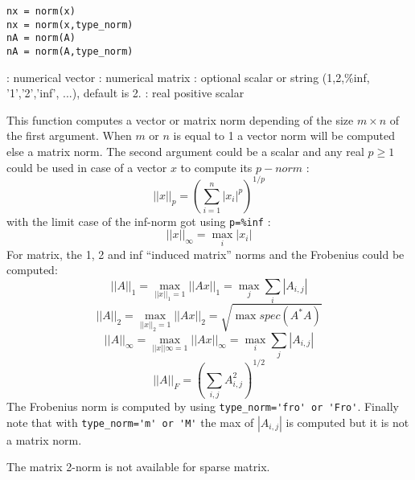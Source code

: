 
\begin{mandesc}
\end{mandesc}

\begin{calling_sequence}
\begin{verbatim}
nx = norm(x)
nx = norm(x,type_norm)
nA = norm(A)
nA = norm(A,type_norm)
\end{verbatim}
\end{calling_sequence}
\begin{parameters}
  \begin{varlist}
     :  numerical vector
     :  numerical matrix
     : optional scalar or string (1,2,\%inf, '1','2','inf',
    ...), default is 2.
     : real positive scalar
  \end{varlist}
\end{parameters}

\begin{mandescription}
This function computes a vector or matrix norm depending of the size $m
\times n$ of the  first argument. When $m$ or $n$ is equal to 1 a vector
norm will be computed else a matrix norm. The second argument could
be a scalar and any real $p \ge 1$ could be used in case of a vector
$x$ to compute its $p-norm$ :
$$
    ||x||_p = \left( \sum_{i=1}^n |x_i|^p \right)^{1/p}
$$
with the limit case of the inf-norm got using \verb+p=%inf+ :
$$
    ||x||_{\infty} = \max_i |x_i|
$$
For matrix, the 1, 2 and inf ``induced matrix'' norms and the
Frobenius could be computed:
$$
    ||A||_1 = \max_{||x||_1 = 1} ||Ax||_1 = \max_j \sum_i |A_{i,j}|  
$$
$$
    ||A||_2 = \max_{||x||_2 = 1} ||Ax||_2 = \sqrt{\max spec(A^* A)}
$$
$$
    ||A||_{\infty} = \max_{||x||{\infty} = 1} ||Ax||_{\infty} = \max_i \sum_j |A_{i,j}|  
$$
$$
   ||A||_F =  \left( \sum_{i,j} A_{i,j}^2 \right)^{1/2}
$$
The Frobenius norm is computed by using  \verb+type_norm='fro' or 'Fro'+. 
Finally note that with \verb+type_norm='m' or 'M'+ the max 
of $|A_{i,j}|$ is computed but it is not a matrix norm.

The matrix 2-norm is not available for sparse matrix.

\end{mandescription}

